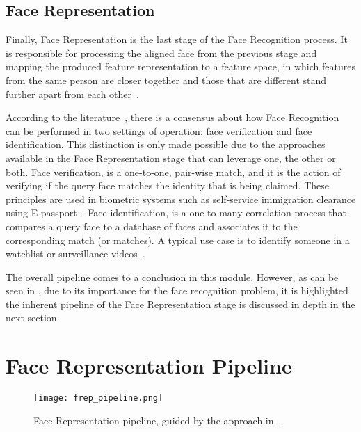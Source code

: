 \documentclass[class=report, crop=false, a4paper, 12pt]{standalone}
\begin{document}
\subsection{Face Representation}
\par Finally, Face Representation is the last stage of the Face Recognition process. It is responsible for processing the aligned face from the previous stage and mapping the produced feature representation to a feature space, in which features from the same person are closer together and those that are different stand further apart from each other~\autocite{duElementsEndtoendDeep2022}.
\par According to the literature~\autocite{duElementsEndtoendDeep2022,liHandbookFaceRecognition2011,ranjanDeepLearningUnderstanding2018,schroffFaceNetUnifiedEmbedding2015,wangDeepFaceRecognition2021}, there is a consensus about how Face Recognition can be performed in two settings of operation: face verification and face identification. This distinction is only made possible due to the approaches available in the Face Representation stage that can leverage one, the other or both. Face verification, is a one-to-one, pair-wise match, and it is the action of verifying if the query face matches the identity that is being claimed. These principles are used in biometric systems such as self-service immigration clearance using E-passport~\autocite{liHandbookFaceRecognition2011}. Face identification, is a one-to-many correlation process that compares a query face to a database of faces and associates it to the corresponding match (or matches). A typical use case is to identify someone in a watchlist or surveillance videos~\autocite{liHandbookFaceRecognition2011}.



\vspace{0.7\baselineskip}
\par The overall pipeline comes to a conclusion in this module. However, as can be seen in , due to its importance for the face recognition problem, it is highlighted the inherent pipeline of the Face Representation stage is discussed in depth in the next section.

\section{Face Representation Pipeline}
\begin{figure}[!h]
    \centering
    \texttt{[image: frep\_pipeline.png]}
    \caption[Pipeline]{Face Representation pipeline, guided by the approach in~\autocite{wangDeepFaceRecognition2021}.}
    \label{fig:frep pipeline}
\end{figure}
\end{document}
